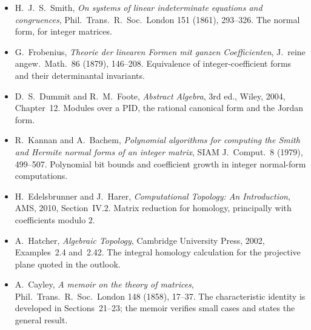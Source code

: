 \begin{itemize}
\item H.~J.~S.~Smith, \emph{On systems of linear indeterminate equations and congruences}, Phil.\ Trans.\ R.\ Soc.\ London 151 (1861), 293--326. The normal form, for integer matrices.
\item G.~Frobenius, \emph{Theorie der linearen Formen mit ganzen Coefficienten}, J.\ reine angew.\ Math.\ 86 (1879), 146--208. Equivalence of integer-coefficient forms and their determinantal invariants.
\item D.~S.~Dummit and R.~M.~Foote, \emph{Abstract Algebra}, 3rd ed., Wiley, 2004, Chapter~12. Modules over a PID, the rational canonical form and the Jordan form.
\item R.~Kannan and A.~Bachem, \emph{Polynomial algorithms for computing the Smith and Hermite normal forms of an integer matrix}, SIAM J.\ Comput.\ 8 (1979), 499--507. Polynomial bit bounds and coefficient growth in integer normal-form computations.
\item H.~Edelsbrunner and J.~Harer, \emph{Computational Topology: An Introduction}, AMS, 2010, Section~IV.2. Matrix reduction for homology, principally with coefficients modulo $2$.
\item A.~Hatcher, \emph{Algebraic Topology}, Cambridge University Press, 2002, Examples~2.4 and~2.42. The integral homology calculation for the projective plane quoted in the outlook.
\item A.~Cayley, \emph{A memoir on the theory of matrices}, Phil.\ Trans.\ R.\ Soc.\ London 148 (1858), 17--37. The characteristic identity is developed in Sections~21--23; the memoir verifies small cases and states the general result.
\end{itemize}
